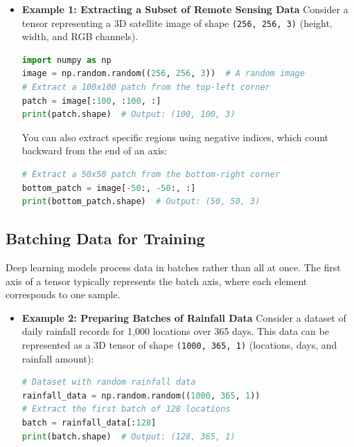 \begin{itemize}
    \item \textbf{Example 1: Extracting a Subset of Remote Sensing Data}
    Consider a tensor representing a 3D satellite image of shape \texttt{(256, 256, 3)} (height, width, and RGB channels).
\begin{lstlisting}[language=Python]
import numpy as np
image = np.random.random((256, 256, 3))  # A random image
# Extract a 100x100 patch from the top-left corner
patch = image[:100, :100, :]
print(patch.shape)  # Output: (100, 100, 3)
\end{lstlisting}
You can also extract specific regions using negative indices, which count backward from the end of an axis:
\begin{lstlisting}[language=Python]
# Extract a 50x50 patch from the bottom-right corner
bottom_patch = image[-50:, -50:, :]
print(bottom_patch.shape)  # Output: (50, 50, 3)
\end{lstlisting}
\end{itemize}
\subsection{Batching Data for Training}

Deep learning models process data in batches rather than all at once. The first axis of a tensor typically represents the batch axis, where each element corresponds to one sample.
\begin{itemize}
    \item \textbf{Example 2: Preparing Batches of Rainfall Data}
    Consider a dataset of daily rainfall records for 1,000 locations over 365 days. This data can be represented as a 3D tensor of shape \texttt{(1000, 365, 1)} (locations, days, and rainfall amount):


\begin{lstlisting}[language=Python]
# Dataset with random rainfall data
rainfall_data = np.random.random((1000, 365, 1))
# Extract the first batch of 128 locations
batch = rainfall_data[:128]
print(batch.shape)  # Output: (128, 365, 1)
\end{lstlisting}
\end{itemize}

